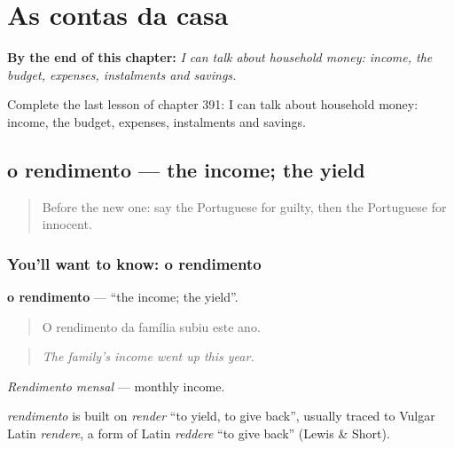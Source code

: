 
\chapter{As contas da casa}
\label{ch:pt-as-contas-da-casa}

\begin{chapteropening}
\textbf{By the end of this chapter:} \emph{I can talk about household money: income, the budget, expenses, instalments and savings.}

Complete the last lesson of chapter 391: I can talk about household money: income, the budget, expenses, instalments and savings.
\end{chapteropening}

\section[o rendimento]{o rendimento — the income; the yield}

\label{lesson:PT-C391-rendimento}



\begin{quote}
Before the new one: say the Portuguese for guilty, then the Portuguese for innocent.
\end{quote}

\subsection*{You'll want to know: o rendimento}
\textbf{o rendimento} — \textquotedblleft{}the income; the yield\textquotedblright{}.

\begin{quote}
O rendimento da família subiu este ano.
\end{quote}

\begin{quote}
\emph{The family's income went up this year.}
\end{quote}

\emph{Rendimento mensal} — monthly income.

\begin{cousinweb}
\emph{rendimento} is built on \emph{render} \textquotedblleft{}to yield, to give back\textquotedblright{}, usually traced to Vulgar Latin \emph{rendere}, a form of Latin \emph{reddere} \textquotedblleft{}to give back\textquotedblright{} (Lewis \& Short).
\end{cousinweb}

